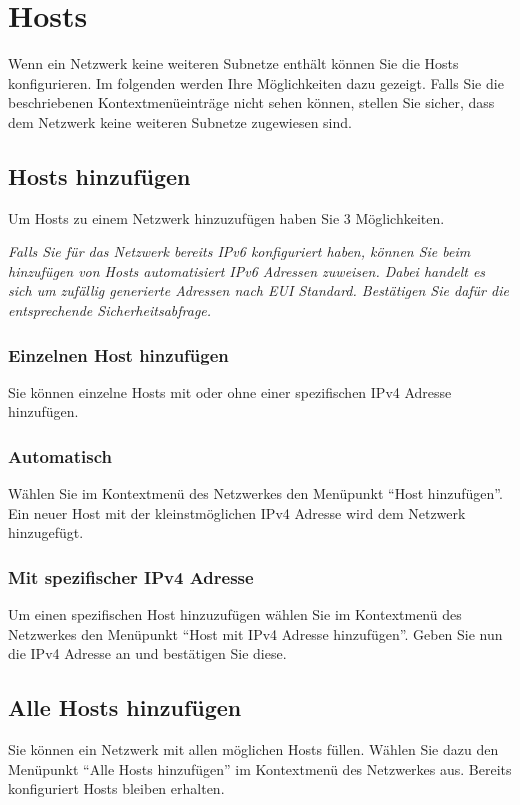 \section{Hosts}
Wenn ein Netzwerk keine weiteren Subnetze enthält können Sie die Hosts
konfigurieren. Im folgenden werden Ihre Möglichkeiten dazu gezeigt.
Falls Sie die beschriebenen Kontextmenüeinträge nicht sehen können, stellen
Sie sicher, dass dem Netzwerk keine weiteren Subnetze zugewiesen sind.

\subsection{Hosts hinzufügen}
\label{HostsHinzufuegen}
Um Hosts zu einem Netzwerk hinzuzufügen haben Sie 3 Möglichkeiten.

\textit{Falls Sie für das Netzwerk bereits IPv6 konfiguriert haben, können Sie
beim hinzufügen von Hosts automatisiert IPv6 Adressen zuweisen. Dabei handelt
es sich um zufällig generierte Adressen nach EUI Standard. Bestätigen Sie dafür
die entsprechende Sicherheitsabfrage.}

\subsubsection{Einzelnen Host hinzufügen}
Sie können einzelne Hosts mit oder ohne einer spezifischen IPv4 Adresse hinzufügen.

\subsubsection{Automatisch}
Wählen Sie im Kontextmenü des Netzwerkes den Menüpunkt "`Host hinzufügen"'.
Ein neuer Host mit der kleinstmöglichen IPv4 Adresse wird dem Netzwerk
hinzugefügt.

\subsubsection{Mit spezifischer IPv4 Adresse}
Um einen spezifischen Host hinzuzufügen wählen Sie im Kontextmenü des Netzwerkes
den Menüpunkt "`Host mit IPv4 Adresse hinzufügen"'.
Geben Sie nun die IPv4 Adresse an und bestätigen Sie diese.

\subsection{Alle Hosts hinzufügen}
Sie können ein Netzwerk mit allen möglichen Hosts füllen. Wählen Sie dazu den
Menüpunkt "`Alle Hosts hinzufügen"' im Kontextmenü des Netzwerkes aus.
Bereits konfiguriert Hosts bleiben erhalten.

